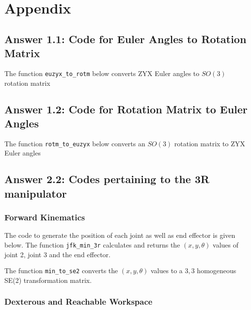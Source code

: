 
\section{Appendix}

\subsection[A1.1: Code]{Answer 1.1: Code for Euler Angles to Rotation Matrix}

\label{app:a1.1-eu2rm-code}

The function \texttt{euzyx\_to\_rotm} below converts ZYX Euler angles to $SO(3)$ rotation matrix



\subsection[A1.2: Code]{Answer 1.2: Code for Rotation Matrix to Euler Angles}

\label{app:a1.2-rm2eu-code}

The function \texttt{rotm\_to\_euzyx} below converts an $SO(3)$ rotation matrix to ZYX Euler angles



\subsection[A2.2: Codes]{Answer 2.2: Codes pertaining to the 3R manipulator}

\subsubsection{Forward Kinematics}
\label{app:a2.2-fk-code}

The code to generate the position of each joint as well as end effector is given below. The function \texttt{jfk\_min\_3r} calculates and returns the $(x, y, \theta)$ values of joint 2, joint 3 and the end effector. 

The function \texttt{min\_to\_se2} converts the $(x, y, \theta)$ values to a $3,3$ homogeneous SE(2) transformation matrix.



\subsubsection{Dexterous and Reachable Workspace}
\label{app:a2.2-ws-dws-show-code}

